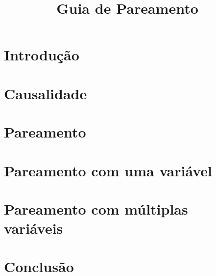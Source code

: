 \documentclass[12pt, a4paper]{article}
\title{\sc Guia de Pareamento}
\author{}
\date{}
\numberwithin{equation}{section}
\numberwithin{table}{section}
\numberwithin{figure}{section}
\begin{document}
\maketitle
\tableofcontents
\pagebreak \newpage

\doublespacing


\section{\sc Introdução} \label{introducao}




\section{\sc Causalidade}\label{poder}



\section{\sc Pareamento}\label{late}



\section{\sc Pareamento com uma variável}\label{cluster}



\section{\sc Pareamento com múltiplas variáveis}\label{strat}




%

\section{\sc Conclusão}



\setlength\bibsep{0pt}
 

\end{document}
